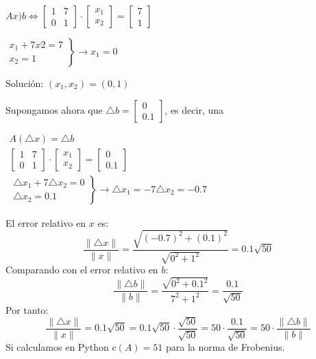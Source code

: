 $Ax)b\Longleftrightarrow\begin{bmatrix}
	1 & 7\\
	0 & 1
\end{bmatrix}\cdot\begin{bmatrix}
x_1\\
x_2
\end{bmatrix}=\begin{bmatrix}
7\\
1
\end{bmatrix}$

$\left.\begin{array}{r}
	x_1+7x2=7\\
	x_2=1
\end{array}\right\}\longrightarrow x_1=0$

Solución: $(x_1,x_2)=(0,1)$

Supongamos ahora que $\triangle b=\begin{bmatrix}
	0\\
	0.1
\end{bmatrix}$, es decir, una 

$\begin{array}{l}
	A(\triangle x)=\triangle b\\
	\begin{bmatrix}
		1 & 7\\
		0 & 1
	\end{bmatrix}\cdot\begin{bmatrix}
	x_1\\
	x_2
	\end{bmatrix}=\begin{bmatrix}
	0\\
	0.1
	\end{bmatrix}\\
	\left.\begin{array}{r}
		\triangle x_1+7\triangle x_2=0\\
		\triangle x_2=0.1
	\end{array}\right\}\longrightarrow\triangle x_1=-7\triangle x_2=-0.7
\end{array}$

El error relativo en $x$ es: \[ \dfrac{\|\triangle x\|}{\|x\|}=\dfrac{\sqrt{(-0.7)^2+(0.1)^2}}{\sqrt{0^2+1^2}}=0.1\sqrt{50} \]Comparando con el error relativo en $b$:
\[ \dfrac{\|\triangle b\|}{\|b\|}=\dfrac{\sqrt{0^2+0.1^2}}{7^2+1^2}=\dfrac{0.1}{\sqrt{50}} \]Por tanto:\[ \dfrac{\|\triangle x\|}{\|x\|}=0.1\sqrt{50}=0.1\sqrt{50}\cdot\dfrac{\sqrt{50}}{\sqrt{50}}=50\cdot\dfrac{0.1}{\sqrt{50}}=50\cdot\dfrac{\|\triangle b\|}{\|b\|} \]
Si calculamos en Python $\mathrm{c}(A)=51$ para la norma de Frobenius.

